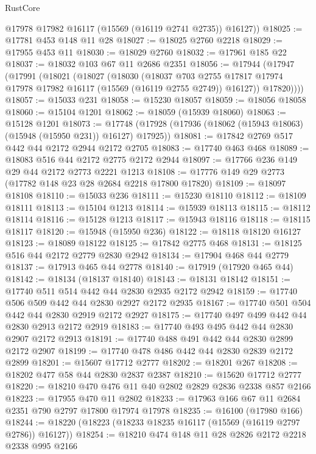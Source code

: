 \begin{lexlean}{RustCore}
\begin{coremodule}
        @17978
        @17982
        @16117
        (@15569 (@16119 @2741 @2735))
        @16127))
@18025 := @17781 @453 @148 @11 @28
@18027 := @18025 @2760 @2218
@18029 := @17955 @453 @11
@18030 := @18029 @2760
@18032 := @17961 @185 @22
@18037 := @18032 @103 @67 @11 @2686 @2351
@18056 := @17944
    (@17947
      (@17991
        (@18021
          (@18027
            (@18030
              (@18037
                @703
                @2755
                @17817
                @17974
                @17978
                @17982
                @16117
                (@15569 (@16119 @2755 @2749))
                @16127))
            @17820))))
@18057 := @15033 @231
@18058 := @15230 @18057
@18059 := @18056 @18058
@18060 := @15104 @1201
@18062 := @18059 (@15939 @18060)
@18063 := @15128 @1201
@18073 := @17748 (@17928 (@17936 (@18062 (@15943 @18063) (@15948 (@15950 @231)) @16127) @17925))
@18081 := @17842 @2769 @517 @442 @44 @2172 @2944 @2172 @2705
@18083 := @17740 @463 @468
@18089 := @18083 @516 @44 @2172 @2775 @2172 @2944
@18097 := @17766 @236 @149 @29 @44 @2172 @2773 @2221 @1213
@18108 := @17776 @149 @29 @2773 (@17782 @148 @23 @28 @2684 @2218 @17800 @17820)
@18109 := @18097 @18108
@18110 := @15033 @236
@18111 := @15230 @18110
@18112 := @18109 @18111
@18113 := @15104 @1213
@18114 := @15939 @18113
@18115 := @18112 @18114
@18116 := @15128 @1213
@18117 := @15943 @18116
@18118 := @18115 @18117
@18120 := @15948 (@15950 @236)
@18122 := @18118 @18120 @16127
@18123 := @18089 @18122
@18125 := @17842 @2775 @468
@18131 := @18125 @516 @44 @2172 @2779 @2830 @2942
@18134 := @17904 @468 @44 @2779
@18137 := @17913 @465 @44 @2778
@18140 := @17919 (@17920 @465 @44)
@18142 := @18134 (@18137 @18140)
@18143 := @18131 @18142
@18151 := @17740 @511 @514 @442 @44 @2830 @2935 @2172 @2942
@18159 := @17740 @506 @509 @442 @44 @2830 @2927 @2172 @2935
@18167 := @17740 @501 @504 @442 @44 @2830 @2919 @2172 @2927
@18175 := @17740 @497 @499 @442 @44 @2830 @2913 @2172 @2919
@18183 := @17740 @493 @495 @442 @44 @2830 @2907 @2172 @2913
@18191 := @17740 @488 @491 @442 @44 @2830 @2899 @2172 @2907
@18199 := @17740 @478 @486 @442 @44 @2830 @2839 @2172 @2899
@18201 := @15607 @17712 @2777
@18202 := @18201 @267
@18208 := @18202 @477 @58 @44 @2830 @2837 @2387
@18210 := @15620 @17712 @2777
@18220 := @18210 @470 @476 @11 @40 @2802 @2829 @2836 @2338 @857 @2166
@18223 := @17955 @470 @11 @2802
@18233 := @17963 @166 @67 @11 @2684 @2351 @790 @2797 @17800 @17974 @17978
@18235 := @16100 (@17980 @166)
@18244 := @18220 (@18223 (@18233 @18235 @16117 (@15569 (@16119 @2797 @2786)) @16127))
@18254 := @18210 @474 @148 @11 @28 @2826 @2172 @2218 @2338 @995 @2166

\end{coremodule}
\end{lexlean}

